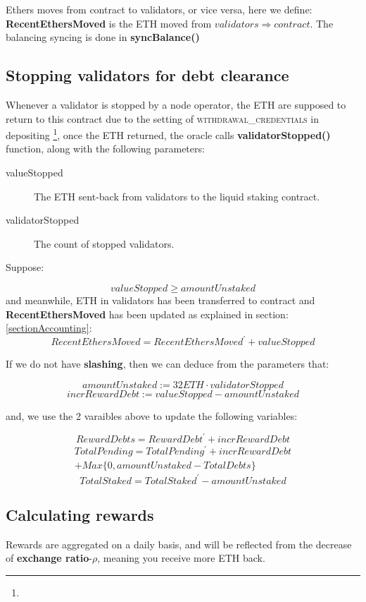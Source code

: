 \documentclass{article}
\begin{document}
Ethers moves from contract to validators, or vice versa, here we define: \textbf{RecentEthersMoved} is the ETH moved from ${validators}\Longrightarrow{contract}$. The balancing syncing is done in \textbf{syncBalance()}

\subsection{Stopping validators for debt clearance}
Whenever a validator is stopped by a node operator, the ETH are supposed to return to this contract due to the setting of \textsc{withdrawal\_credentials} in depositing \footnote{}, once the ETH returned, the oracle calls \textbf{validatorStopped()} function, along with the following parameters:
\begin{description}
\item[valueStopped] The ETH sent-back from validators to the liquid staking contract.
\item[validatorStopped] The count of stopped validators.
\end{description}
Suppose:

\[valueStopped \geq amountUnstaked \]
and meanwhile, ETH in validators has been transferred to contract and \textbf{RecentEthersMoved} has been updated as explained in section:\ref{sectionAccounting}:
\[RecentEthersMoved = RecentEthersMoved^{\prime} + valueStopped\]

If we do not have \textbf{slashing}, then we can deduce from the parameters that:
\begin{lemma}
\[amountUnstaked := 32 ETH \cdot validatorStopped\]
\[incrRewardDebt := valueStopped - amountUnstaked\]
\end{lemma}

and, we use the 2 varaibles above to update the following variables:
\begin{theorem}
\label{validatorStopped}
\[RewardDebts = RewardDebt^{\prime} + incrRewardDebt\]
\begin{multline}
TotalPending = TotalPending^{\prime} + incrRewardDebt \\
+ Max\{0, amountUnstaked - TotalDebts\}
\end{multline}
\[TotalStaked = TotalStaked^{\prime} -  amountUnstaked \]
\end{theorem}

\subsection{Calculating rewards}
Rewards are aggregated on a daily basis, and will be reflected from the decrease of \textbf{exchange ratio}-$\rho$, meaning you receive more ETH back.
\end{document}
